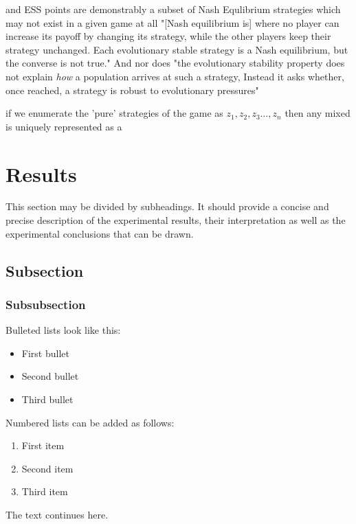 \documentclass[journal,article,accept,oneauthors,pdftex,10pt,a4paper]{mdpi}
\begin{document}
and ESS points are demonstrably a subset of Nash Equlibrium strategies which may not exist in a given game at all\cite{weibull} "[Nash equilibrium is] where no player can increase its payoff by changing its strategy, while the other players keep their strategy unchanged. Each evolutionary stable strategy is a Nash equilibrium, but the converse is not true." \cite{gloss1}
And nor does "the evolutionary stability property does not explain \textit{how} a population arrives at such a strategy, Instead it asks whether, once reached, a strategy is robust to evolutionary pressures"\cite{weibull}

if we enumerate the 'pure' strategies of the game as $z_1,z_2,z_3\dots,z_n$ then any mixed is uniquely represented as a 

\section{Results}

This section may be divided by subheadings. It should provide a concise and precise description of the experimental results, their interpretation as well as the experimental conclusions that can be drawn.

\subsection{Subsection}

\subsubsection{Subsubsection}

Bulleted lists look like this:
\begin{itemize}[leftmargin=*,labelsep=4mm]
\item	First bullet
\item	Second bullet
\item	Third bullet
\end{itemize}

Numbered lists can be added as follows:
\begin{enumerate}[leftmargin=*,labelsep=3mm]
\item	First item
\item	Second item
\item	Third item
\end{enumerate}

The text continues here.
\end{document}
